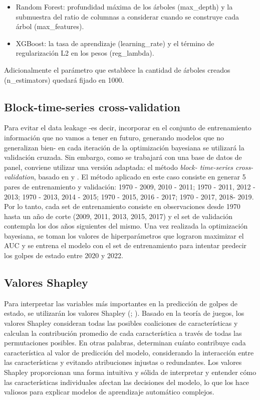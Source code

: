 \documentclass{article}
\begin{document}
\begin{itemize}
 \item Random Forest: profundidad máxima de los árboles (max\_depth) y la 
 submuestra del ratio de columnas a considerar cuando se construye cada árbol 
 (max\_features).
 \item XGBoost: la tasa de aprendizaje (learning\_rate) y el término de 
 regularización L2 en los pesos (reg\_lambda).
\end{itemize}

Adicionalmente el parámetro que establece la cantidad de árboles creados 
(n\_estimators) quedará fijado en 1000.

\subsection{Block-time-series cross-validation}
Para evitar el data leakage -es decir, incorporar en el conjunto de entrenamiento
información que no vamos a tener en futuro, generando modelos que no generalizan bien- 
en cada iteración de la optimización bayesiana
se utilizará la validación cruzada. Sin embargo, como se trabajará con una base
de datos de panel, conviene utilizar una versión adaptada: el método \textit{block-
time-series cross-validation}, basado en \cite{Bur94} y \cite{RAc00}. El método 
aplicado en este caso consiste en generar 5 pares de entrenamiento y validación: 
{1970 - 2009, 2010 - 2011}; {1970 - 2011, 2012 - 2013}; {1970 - 2013, 2014 - 2015}; 
{1970 - 2015, 2016 - 2017}; {1970 - 2017, 2018- 2019}. Por lo tanto, cada set de 
entrenamiento consiste en observaciones desde 1970 hasta un año de corte (2009, 
2011, 2013, 2015, 2017) y el set de validación contempla los dos años siguientes 
del mismo. Una vez realizada la optimización bayesiana, se toman los valores de 
hiperparámetros que lograron maximizar el AUC y se entrena el modelo con el set de 
entrenamiento para intentar predecir los golpes de estado entre 2020 y 2022. 

\subsection{Valores Shapley}
Para interpretar las variables más importantes en la predicción de golpes de estado, se 
utilizarán los valores Shapley (\cite{Str10}; \cite{Lun17}). Basado en la teoría de 
juegos, los valores Shapley consideran todas las posibles coaliciones de características 
y calculan la contribución promedio de cada característica a través de todas las 
permutaciones posibles. En otras palabras, determinan cuánto contribuye cada 
característica al valor de predicción del modelo, considerando la interacción entre las 
características y evitando atribuciones injustas o redundantes. Los valores Shapley
proporcionan una forma intuitiva y sólida de interpretar y entender cómo las 
características individuales afectan las decisiones del modelo, lo que los hace valiosos 
para explicar modelos de aprendizaje automático complejos.
\end{document}

